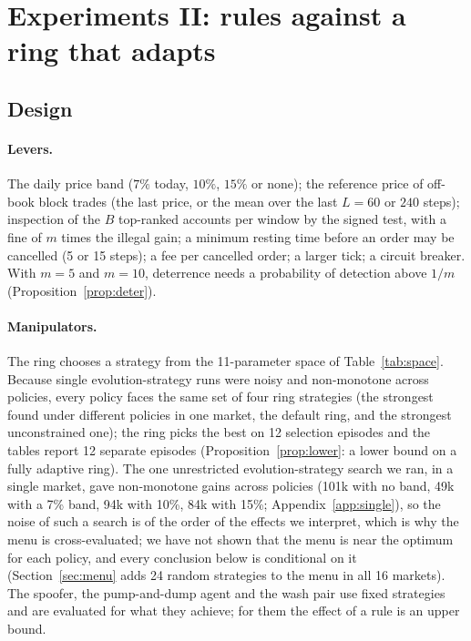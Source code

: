 \section{Experiments II: rules against a ring that adapts}\label{sec:policy}

\subsection{Design}

\paragraph{Levers.} The daily price band ($7\%$ today, $10\%$, $15\%$ or none); the reference price of off-book block trades (the last price, or the mean over the last $L=60$ or $240$ steps); inspection of the $B$ top-ranked accounts per window by the signed test, with a fine of $m$ times the illegal gain; a minimum resting time before an order may be cancelled (5 or 15 steps); a fee per cancelled order; a larger tick; a circuit breaker. With $m=5$ and $m=10$, deterrence needs a probability of detection above $1/m$ (Proposition~\ref{prop:deter}).

\paragraph{Manipulators.} The ring chooses a strategy from the 11-parameter space of Table~\ref{tab:space}. Because single evolution-strategy runs were noisy and non-monotone across policies, every policy faces the same set of four ring strategies (the strongest found under different policies in one market, the default ring, and the strongest unconstrained one); the ring picks the best on 12 selection episodes and the tables report 12 separate episodes (Proposition~\ref{prop:lower}: a lower bound on a fully adaptive ring). The one unrestricted evolution-strategy search we ran, in a single market, gave non-monotone gains across policies (101k with no band, 49k with a 7\% band, 94k with 10\%, 84k with 15\%; Appendix~\ref{app:single}), so the noise of such a search is of the order of the effects we interpret, which is why the menu is cross-evaluated; we have not shown that the menu is near the optimum for each policy, and every conclusion below is conditional on it (Section~\ref{sec:menu} adds 24 random strategies to the menu in all 16 markets). The spoofer, the pump-and-dump agent and the wash pair use fixed strategies and are evaluated for what they achieve; for them the effect of a rule is an upper bound.

